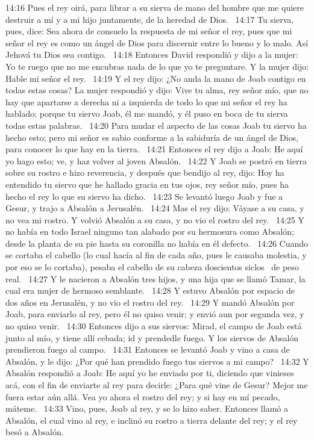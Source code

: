 14:16 Pues el rey oirá, para librar a su sierva de mano del hombre que me quiere destruir a mí y a mi hijo juntamente, de la heredad de Dios.  
14:17 Tu sierva, pues, dice: Sea ahora de consuelo la respuesta de mi señor el rey, pues que mi señor el rey es como un ángel de Dios para discernir entre lo bueno y lo malo. Así Jehová tu Dios sea contigo.  
14:18 Entonces David respondió y dijo a la mujer: Yo te ruego que no me encubras nada de lo que yo te preguntare. Y la mujer dijo: Hable mi señor el rey.  
14:19 Y el rey dijo: ¿No anda la mano de Joab contigo en todas estas cosas? La mujer respondió y dijo: Vive tu alma, rey señor mío, que no hay que apartarse a derecha ni a izquierda de todo lo que mi señor el rey ha hablado; porque tu siervo Joab, él me mandó, y él puso en boca de tu sierva todas estas palabras.  
14:20 Para mudar el aspecto de las cosas Joab tu siervo ha hecho esto; pero mi señor es sabio conforme a la sabiduría de un ángel de Dios, para conocer lo que hay en la tierra.  
14:21 Entonces el rey dijo a Joab: He aquí yo hago esto; ve, y haz volver al joven Absalón.  
14:22 Y Joab se postró en tierra sobre su rostro e hizo reverencia, y después que bendijo al rey, dijo: Hoy ha entendido tu siervo que he hallado gracia en tus ojos, rey señor mío, pues ha hecho el rey lo que su siervo ha dicho.  
14:23 Se levantó luego Joab y fue a Gesur, y trajo a Absalón a Jerusalén.  
14:24 Mas el rey dijo: Váyase a su casa, y no vea mi rostro. Y volvió Absalón a su casa, y no vio el rostro del rey.  
14:25 Y no había en todo Israel ninguno tan alabado por su hermosura como Absalón; desde la planta de su pie hasta su coronilla no había en él defecto.  
14:26 Cuando se cortaba el cabello (lo cual hacía al fin de cada año, pues le causaba molestia, y por eso se lo cortaba), pesaba el cabello de su cabeza doscientos siclos  de peso real.  
14:27 Y le nacieron a Absalón tres hijos, y una hija que se llamó Tamar, la cual era mujer de hermoso semblante.  
14:28 Y estuvo Absalón por espacio de dos años en Jerusalén, y no vio el rostro del rey.  
14:29 Y mandó Absalón por Joab, para enviarlo al rey, pero él no quiso venir; y envió aun por segunda vez, y no quiso venir.  
14:30 Entonces dijo a sus siervos: Mirad, el campo de Joab está junto al mío, y tiene allí cebada; id y prendedle fuego. Y los siervos de Absalón prendieron fuego al campo.  
14:31 Entonces se levantó Joab y vino a casa de Absalón, y le dijo: ¿Por qué han prendido fuego tus siervos a mi campo?  
14:32 Y Absalón respondió a Joab: He aquí yo he enviado por ti, diciendo que vinieses acá, con el fin de enviarte al rey para decirle: ¿Para qué vine de Gesur? Mejor me fuera estar aún allá. Vea yo ahora el rostro del rey; y si hay en mí pecado, máteme.  
14:33 Vino, pues, Joab al rey, y se lo hizo saber. Entonces llamó a Absalón, el cual vino al rey, e inclinó su rostro a tierra delante del rey; y el rey besó a Absalón.  

